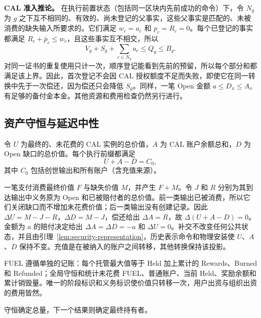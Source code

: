 \noindent\textbf{CAL 准入推论。}
在执行前置状态（包括同一区块内先前成功的命令）下，令 $N_g$ 为 $g$ 之下互不相同的、有效的、尚未登记的父事实，这些父事实是匹配的、未被消费的缺失输入所要求的。它们满足 $w_c=a_c$ 和 $p_c=R_c=0$。每个已登记的事实都满足 $R_c+\bar p_c\le w_c$，且这些事实互不相交，所以
\begin{equation}
 V_g+S_g+\sum_{c\in N_g}a_c\le Q_g\le B_g.
 \label{eq:security-admission}
\end{equation}
对同一证书的重复使用只计一次，顺序登记能看到先前的预留，所以每个部分和都满足该上界。因此，首次登记不会因 CAL 授权额度不足而失败，即使它在同一转换中先于一次偿还，因为偿还只会降低 $S_g$。同样，一笔 Open 金额 $a\le D_x\le A_x$ 有足够的备付金本金。其他资源和费用检查仍然另行进行。

\subsection{资产守恒与延迟中性}
\label{sec:security-conservation}

\begin{theorem}[CAL 守恒]
\label{thm:security-conservation}
令 $U$ 为最终的、未花费的 CAL 实例的总价值，$A$ 为 CAL 账户余额总和，$D$ 为 Open 缺口的总价值。每个执行前缀都满足
\begin{equation}
 U+A-D=C_0,
 \label{eq:security-conservation}
\end{equation}
其中 $C_0$ 包括创世输出和所有账户（含充值来源）。
\end{theorem}
\begin{IEEEproof}
一笔支付消费最终价值 $F$ 与缺失价值 $M$，并产生 $F+M$。令 $J$ 和 $R$ 分别为其到达输出中义务原为 Open 和已被赔付者的总价值。前一类输出已被消费，所以它们关闭缺口而不增加未花费价值；后一类输出没有创建记录。因此 $\Delta U=M-J-R$，$\Delta D=M-J$，偿还给出 $\Delta A=R$，故 $\Delta(U+A-D)=0$。金额为 $a$ 的赔付决定给出 $\Delta A=\Delta D=-a$ 和 $\Delta U=0$。补交不改变任何公共状态，并且由引理~\ref{lem:security-representation}，历史表示命令和物理安装使 $U$、$A$、$D$ 保持不变。充值是在被纳入的账户之间转移，其他转换保持该投影。
\end{IEEEproof}

FUEL 遵循单独的记账：每个托管最大值等于 Held 加上累计的 Rewards、Burned 和 Refunded；全局守恒和统计未花费 FUEL、普通账户、当前 Held、奖励余额和累计销毁量。唯一的阶段标识和义务标识使价值只转移一次，用户出资与组织出资的费用皆然。

守恒确定总量，下一个结果则确定最终持有者。

